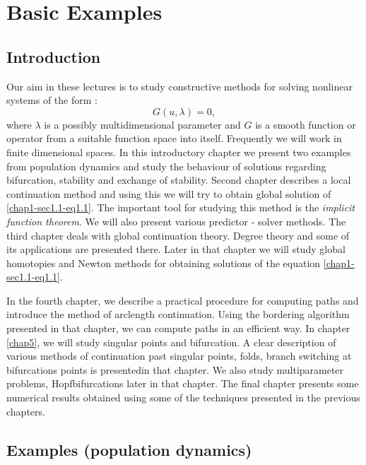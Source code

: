 \chapter{Basic Examples}\label{chap1}

\section{Introduction}\pageoriginale\label{chap1-sec1.1}

Our aim in these lectures is to study constructive methods for solving
nonlinear systems of the form : 
\begin{equation*}
G(u, \lambda)=0 ,  \tag{1.1}\label{chap1-sec1.1-eq1.1}
\end{equation*}
where $\lambda$ is a possibly multidimensional parameter and $G$ is a
smooth function or operator from a suitable function space into
itself. Frequently we will work in finite dimensional spaces. In this
introductory chapter we present two examples from population dynamics
and study the behaviour of solutions regarding bifurcation, stability
and exchange of stability. Second chapter  describes a local
continuation method and using this we will try to obtain global
solution of \eqref{chap1-sec1.1-eq1.1}. The important tool for
studying this method is 
the \textit{implicit function theorem}. We will also present various
predictor - solver methods. The third chapter deals with global
continuation theory. Degree theory and some of its applications are
presented there. Later in that chapter we will study global homotopies
and Newton methods for obtaining solutions of the equation
\eqref{chap1-sec1.1-eq1.1}.  

In the fourth chapter, we describe a practical procedure for computing
paths and introduce the method of arclength continuation. Using the
bordering   algorithm presented in that chapter, we can compute paths
in an efficient way. In chapter \ref{chap5}, we will study singular points and
bifurcation. A clear description of various methods of continuation
past singular points, folds, branch switching at bifurcations points
is presented\pageoriginale in that chapter. We also study
multiparameter problems, 
Hopfbifurcations later in that chapter. The final chapter presents
some numerical results obtained using some of the techniques presented
in the previous chapters. 


\section{Examples (population dynamics)}\label{chap1-sec1.2}

